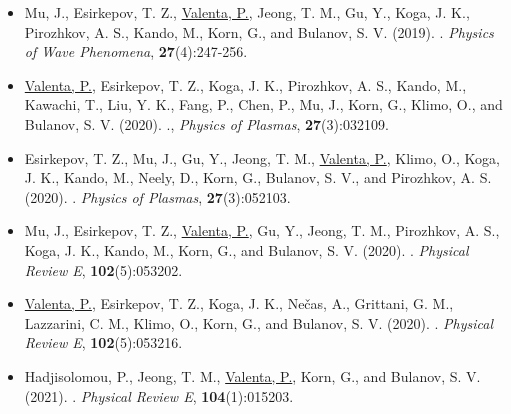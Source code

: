\documentclass[10pt, a4paper, twoside, openright]{report}
\newcommand{\link}[3][blue]{\href{#2}{\color{#1}{#3}}}%
\begin{document}
\begin{itemize}
	
	\item Mu, J., Esirkepov, T. Z., \underline{Valenta, P.}, Jeong, T. M., Gu, Y., Koga, J. K., Pirozhkov, A. S., Kando, M., Korn, G., and Bulanov, S. V. (2019). \link{http://dx.doi.org/10.3103/S1541308X19040010}{High-order harmonics from laser irradiated electron density singularity formed at the bow wave in the laser plasma}. \textit{Physics of Wave Phenomena}, \textbf{27}(4):247-256.
	
	\item \underline{Valenta, P.}, Esirkepov, T. Z., Koga, J. K., Pirozhkov, A. S., Kando, M., Kawachi, T., Liu, Y. K., Fang, P., Chen, P., Mu, J., Korn, G., Klimo, O., and Bulanov, S. V. (2020). \link{http://dx.doi.org/10.1063/1.5142084}{Recoil effects on reflection from relativistic mirrors in laser plasmas}., \textit{Physics of Plasmas}, \textbf{27}(3):032109.
	
	\item Esirkepov, T. Z., Mu, J., Gu, Y., Jeong, T. M., \underline{Valenta, P.}, Klimo, O., Koga, J. K., Kando, M., Neely, D., Korn, G., Bulanov, S. V., and Pirozhkov, A. S. (2020). \link{http://dx.doi.org/10.1063/5.0004525}{Optical probing of relativistic plasma singularities}. \textit{Physics of Plasmas}, \textbf{27}(3):052103.
	
	\item Mu, J., Esirkepov, T. Z., \underline{Valenta, P.}, Gu, Y., Jeong, T. M., Pirozhkov, A. S., Koga, J. K., Kando, M., Korn, G., and Bulanov, S. V. (2020). \link{http://dx.doi.org/10.1103/PhysRevE.102.053202}{Relativistic flying forcibly oscillating reflective diffraction grating}. \textit{Physical Review E}, \textbf{102}(5):053202.
	
	\item \underline{Valenta, P.}, Esirkepov, T. Z., Koga, J. K., Nečas, A., Grittani, G. M., Lazzarini, C. M., Klimo, O., Korn, G., and Bulanov, S. V. (2020). \link{http://dx.doi.org/10.1103/PhysRevE.102.053216}{Polarity reversal of wakefields driven by ultrashort pulse laser}. \textit{Physical Review E}, \textbf{102}(5):053216.
	
	\item Hadjisolomou, P., Jeong, T. M., \underline{Valenta, P.}, Korn, G., and Bulanov, S. V. (2021). \link{http://dx.doi.org/10.1103/PhysRevE.104.015203}{Gamma-ray flash generation in irradiating a thin foil target by a single-cycle tightly focused extreme power laser pulse}. \textit{Physical Review E}, \textbf{104}(1):015203.
	

\end{itemize}
\end{document}
